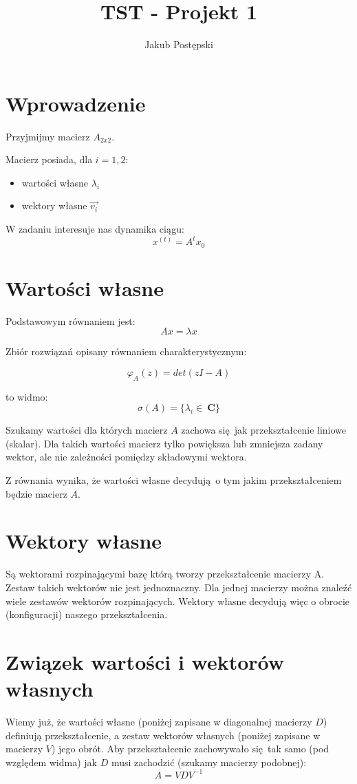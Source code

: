 \documentclass[]{article}
\title{TST - Projekt 1}
\author{Jakub Postępski}
\begin{document}
\maketitle


\section{Wprowadzenie}
Przyjmijmy macierz $A_{2x2}$.

Macierz posiada, dla $i = {1, 2}$:
\begin{itemize}
	\item wartości własne $\lambda_i$
	\item wektory własne $\vec{v_i}$
\end{itemize}

W zadaniu interesuje nas dynamika ciągu:
\[x^{(t)} = A^tx_0 \]

\section{Wartości własne}

Podstawowym równaniem jest:
\[ Ax = \lambda x\]

Zbiór rozwiązań opisany równaniem charakterystycznym:

\[ \varphi_A(z) = det(zI-A) \]

to widmo: 
\[\sigma(A) = \{ \lambda_i \in \  \textbf{C}\} \]

Szukamy wartości dla których macierz $A$ zachowa się jak przekształcenie liniowe (skalar). Dla takich wartości macierz tylko powiększa lub zmniejsza zadany wektor, ale nie zależności pomiędzy składowymi wektora.

Z równania wynika, że wartości własne decydują o tym jakim przekształceniem będzie macierz $A$.

\section{Wektory własne}
Są wektorami rozpinającymi bazę którą tworzy przekształcenie macierzy A. Zestaw takich wektorów nie jest jednoznaczny. Dla jednej macierzy można znaleźć wiele zestawów wektorów rozpinających. Wektory własne decydują więc o obrocie (konfiguracji) naszego przekształcenia.

\section{Związek wartości i wektorów własnych}
Wiemy już, że wartości własne (poniżej zapisane w diagonalnej macierzy $D$) definiują przekształcenie, a zestaw wektorów własnych (poniżej zapisane w macierzy $V$) jego obrót. Aby przekształcenie zachowywało się tak samo (pod względem widma) jak $D$ musi zachodzić (szukamy macierzy podobnej):
\[A = VDV^{-1}\]
\end{document}
